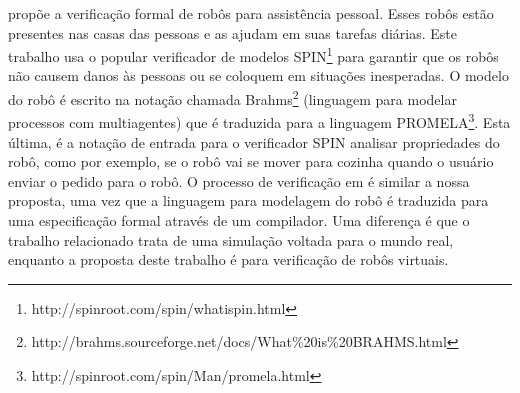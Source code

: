  propõe a verificação formal de robôs para assistência pessoal. Esses robôs estão presentes nas casas das pessoas e as ajudam em suas tarefas diárias. Este trabalho usa o popular verificador de modelos SPIN\footnote[10]{http://spinroot.com/spin/whatispin.html} para garantir que os robôs não causem danos às pessoas ou se coloquem em situações inesperadas. 
O modelo do robô é escrito na notação chamada Brahms\footnote[11]{http://brahms.sourceforge.net/docs/What\%20is\%20BRAHMS.html} (linguagem para modelar processos com multiagentes) que é traduzida para a linguagem PROMELA\footnote[12]{http://spinroot.com/spin/Man/promela.html}. Esta última, é a notação de entrada para o verificador SPIN analisar propriedades do robô, como por exemplo,
se o robô vai se mover para cozinha quando o usuário enviar o pedido para o robô.  
O processo de verificação em  é similar a nossa proposta, uma vez que a linguagem para modelagem do robô é traduzida para uma especificação formal através de um compilador. Uma diferença é que o trabalho relacionado trata de uma simulação voltada para o mundo real, enquanto a proposta deste trabalho é para verificação de robôs virtuais.

